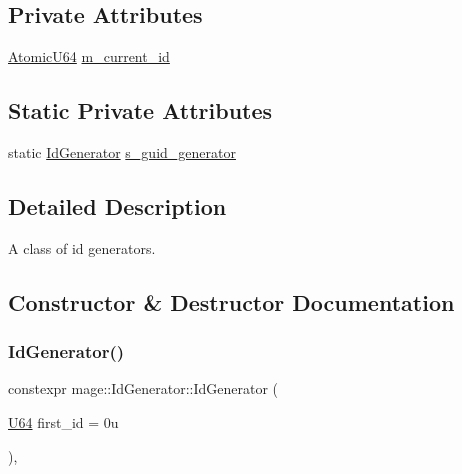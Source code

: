 \subsection*{Private Attributes}
\begin{DoxyCompactItemize}
\item 
\mbox{\hyperlink{namespacemage_a694beb1edf301f410ce0b33c96b09871}{Atomic\+U64}} \mbox{\hyperlink{classmage_1_1_id_generator_ab8c5396d9050530ce030b3c8e2f6b62f}{m\+\_\+current\+\_\+id}}
\end{DoxyCompactItemize}
\subsection*{Static Private Attributes}
\begin{DoxyCompactItemize}
\item 
static \mbox{\hyperlink{classmage_1_1_id_generator}{Id\+Generator}} \mbox{\hyperlink{classmage_1_1_id_generator_aae064239698f2a64515bc0e91ff9a303}{s\+\_\+guid\+\_\+generator}}
\end{DoxyCompactItemize}


\subsection{Detailed Description}
A class of id generators. 

\subsection{Constructor \& Destructor Documentation}
\mbox{\label{classmage_1_1_id_generator_a3a9dc810d9ce4fcdf9bea206723c78d0}} 
\subsubsection{\texorpdfstring{Id\+Generator()}{IdGenerator()}\hspace{0.1cm}{\footnotesize\ttfamily [1/3]}}
{\footnotesize\ttfamily constexpr mage\+::\+Id\+Generator\+::\+Id\+Generator (\begin{DoxyParamCaption}\item[{\mbox{\hyperlink{namespacemage_ae0ad2dd0035dba92ed0f2e84c182b03b}{U64}}}]{first\+\_\+id = {\ttfamily 0u} }\end{DoxyParamCaption})\hspace{0.3cm}{\ttfamily [explicit]}, {\ttfamily [noexcept]}}


